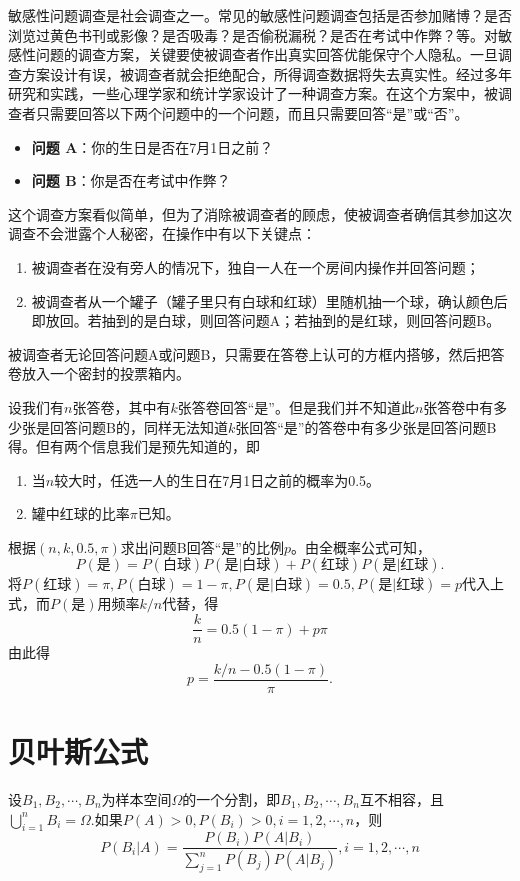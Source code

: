 \begin{example}[（敏感性问题调查）]
    敏感性问题调查是社会调查之一。常见的敏感性问题调查包括是否参加赌博？是否浏览过黄色书刊或影像？是否吸毒？是否偷税漏税？是否在考试中作弊？等。对敏感性问题的调查方案，关键要使被调查者作出真实回答优能保守个人隐私。一旦调查方案设计有误，被调查者就会拒绝配合，所得调查数据将失去真实性。经过多年研究和实践，一些心理学家和统计学家设计了一种调查方案。在这个方案中，被调查者只需要回答以下两个问题中的一个问题，而且只需要回答“是”或“否”。
    \begin{itemize}
        \item {\bf 问题 A}：你的生日是否在7月1日之前？
        \item {\bf 问题 B}：你是否在考试中作弊？
    \end{itemize}
    这个调查方案看似简单，但为了消除被调查者的顾虑，使被调查者确信其参加这次调查不会泄露个人秘密，在操作中有以下关键点：
    \begin{enumerate}
        \item 被调查者在没有旁人的情况下，独自一人在一个房间内操作并回答问题；
        \item 被调查者从一个罐子（罐子里只有白球和红球）里随机抽一个球，确认颜色后即放回。若抽到的是白球，则回答问题A；若抽到的是红球，则回答问题B。
\end{enumerate}

被调查者无论回答问题A或问题B，只需要在答卷上认可的方框内搭够，然后把答卷放入一个密封的投票箱内。

设我们有$n$张答卷，其中有$k$张答卷回答“是”。但是我们并不知道此$n$张答卷中有多少张是回答问题B的，同样无法知道$k$张回答“是”的答卷中有多少张是回答问题B得。但有两个信息我们是预先知道的，即
\begin{enumerate}
    \item 当$n$较大时，任选一人的生日在7月1日之前的概率为0.5。
    \item 罐中红球的比率$\pi$已知。
\end{enumerate}

根据$(n,k,0.5,\pi)$求出问题B回答“是”的比例$p$。由全概率公式可知，
$$
P(\text{是}) = P(\text{白球})P(\text{是}|\text{白球})+ P(\text{红球})P(\text{是}|\text{红球}).
$$
将$P(\text{红球})=\pi,P(\text{白球})=1-\pi, P(\text{是}|\text{白球})=0.5,P(\text{是}|\text{红球})=p$代入上式，而$P(\text{是})$用频率$k/n$代替，得
$$
\frac{k}{n} = 0.5(1-\pi) + p\pi
$$
由此得
$$
p = \frac{k/n - 0.5(1-\pi)}{\pi}.
$$
\end{example}
\section{贝叶斯公式}
\begin{theorem}[贝叶斯公式] \label{thm:Bayes_Rule} 
设$B_{1},B_{2},\cdots,B_{n}$为样本空间$\Omega$的一个分割，即$B_{1},B_{2},\cdots,B_{n}$互不相容，且$\bigcup_{i=1}^{n} B_{i}=\Omega $.如果$P(A)>0,P(B_{i})>0,i=1,2,\cdots,n$，则$$P(B_{i} |A)=\frac{P(B_{i} )P(A|B_{i} )}{\sum_{j=1}^{n} P(B_{j} )P(A|B_{j} )} ,i=1,2,\cdots ,n$$
\end{theorem}


